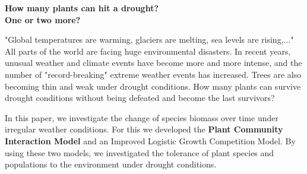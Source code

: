 \documentclass[12pt]{article}
\newcommand{\Problem}{A}
\newcommand{\Team}{2303965}
\begin{document}
\graphicspath{{.}}  %
\thispagestyle{empty}
\vspace*{-16ex}
\vspace{0.5cm}

\begin{center}
	\LARGE \textbf{How many plants can hit a drought?\\ One or two more?}
\end{center}

\vspace{0.5cm}

"Global temperatures are warming, glaciers are melting, sea levels are rising,..." All parts of the world are facing huge environmental disasters. In recent years, unusual weather and climate events have become more and more intense, and the number of "record-breaking" extreme weather events has increased. Trees are also becoming thin and weak under drought conditions. How many plants can survive drought conditions without being defeated and become the last survivors? 

In this paper, we investigate the change of species biomass over time under irregular weather conditions. For this we developed the \textbf{Plant Community Interaction Model} and an {Improved Logistic Growth Competition Model}. By using these two models, we investigated the tolerance of plant species and populations to the environment under drought conditions.
\end{document}
